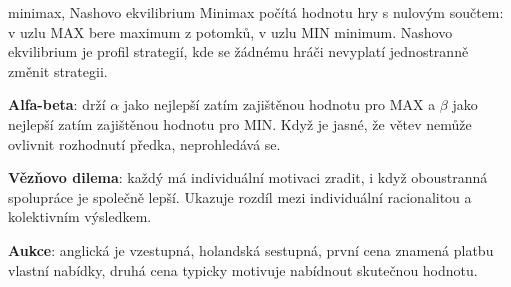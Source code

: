 \begin{defbox}{minimax, Nashovo ekvilibrium}
Minimax počítá hodnotu hry s nulovým součtem: v uzlu MAX bere maximum z potomků, v uzlu MIN minimum. Nashovo ekvilibrium je profil strategií, kde se žádnému hráči nevyplatí jednostranně změnit strategii.
\end{defbox}

\textbf{Alfa-beta}: drží $\alpha$ jako nejlepší zatím zajištěnou hodnotu pro MAX a $\beta$ jako nejlepší zatím zajištěnou hodnotu pro MIN. Když je jasné, že větev nemůže ovlivnit rozhodnutí předka, neprohledává se.

\textbf{Vězňovo dilema}: každý má individuální motivaci zradit, i když oboustranná spolupráce je společně lepší. Ukazuje rozdíl mezi individuální racionalitou a kolektivním výsledkem.

\textbf{Aukce}: anglická je vzestupná, holandská sestupná, první cena znamená platbu vlastní nabídky, druhá cena typicky motivuje nabídnout skutečnou hodnotu.

